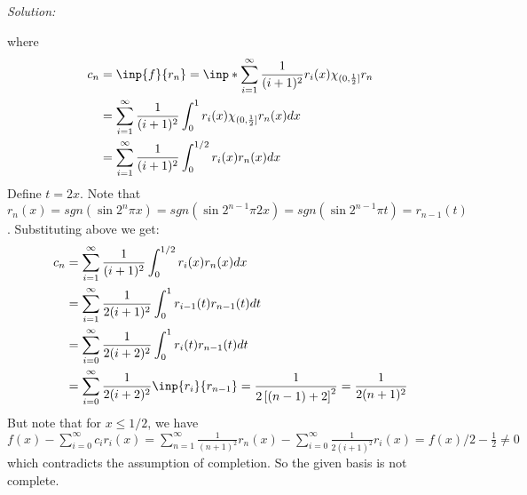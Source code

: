 \documentclass[a4paper, 11pt]{article}
\newenvironment{solution}
    {\textit{Solution:}}
    {}
\begin{document}
\begin{solution}
\begin{enumerate}
    where 
    \begin{align*}
        c_n&=\inp{f}{r_n}=\inp*{\sum_{i=1}^\infty \frac{1}{(i+1)^2}r_i(x)\chi_{(0,\frac{1}{2}]}}{r_n}\\
        &=\sum_{i=1}^\infty \frac{1}{(i+1)^2}\int_0^1 r_i(x)\chi_{(0,\frac{1}{2}]}r_n(x)dx\\
        &=\sum_{i=1}^\infty \frac{1}{(i+1)^2}\int_0^{1/2} r_i(x)r_n(x)dx\\
    \end{align*}
    Define $t=2x$. Note that $r_n(x)=sgn(\sin 2^n\pi x)=sgn(\sin 2^{n-1}\pi 2x)=sgn(\sin 2^{n-1}\pi t)=r_{n-1}(t)$. Substituting above we get:
    \begin{align*}
        c_n&=\sum_{i=1}^\infty \frac{1}{(i+1)^2}\int_0^{1/2} r_i(x)r_n(x)dx\\
        &=\sum_{i=1}^\infty \frac{1}{2(i+1)^2}\int_0^{1} r_{i-1}(t)r_{n-1}(t)dt\\
        &=\sum_{i=0}^\infty \frac{1}{2(i+2)^2}\int_0^{1} r_{i}(t)r_{n-1}(t)dt\\
        &=\sum_{i=0}^\infty \frac{1}{2(i+2)^2}\inp{r_{i}}{r_{n-1}}=\frac{1}{2\left[(n-1)+2\right]^2}=\frac{1}{2(n+1)^2}\\
    \end{align*}
    But note that for $x\leq 1/2$, we have $f(x)-\sum_{i=0}^\infty c_ir_i(x)=\sum_{n=1}^\infty \frac{1}{(n+1)^2}r_n(x)-\sum_{i=0}^\infty \frac{1}{2(i+1)^2}r_i(x)=f(x)/2-\frac{1}{2}\ne 0$ which contradicts the assumption of completion. So the given basis is not complete. 
\end{enumerate}
\end{solution}
\end{document}
